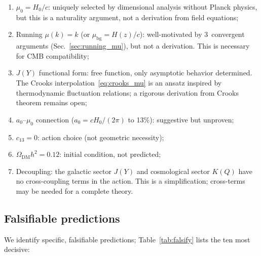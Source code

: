 \documentclass[prd,twocolumn,superscriptaddress,longbibliography,floatfix]{revtex4-2}
\begin{document}
\begin{enumerate}
\item[\textsc{A1.}] $\mu_0 = H_0/c$: uniquely selected by
  dimensional analysis without Planck physics, but this is a
  naturality argument, not a derivation from field equations;
\item[\textsc{A2.}] Running $\mu(k) = k$
  (or $\mu_{\mathrm{bg}} = H(z)/c$): well-motivated by
  3~convergent arguments (Sec.~\ref{sec:running_mu}), but not
  a derivation.  This is necessary for CMB compatibility;
\item[\textsc{A3.}] $J(Y)$ functional form: free function,
  only asymptotic behavior determined.  The Crooks
  interpolation~\eqref{eq:crooks_mu} is an ansatz inspired by
  thermodynamic fluctuation relations; a rigorous derivation
  from Crooks theorem remains open;
\item[\textsc{A4.}] $a_0$--$\mu_0$ connection ($a_0 = cH_0/(2\pi)$
  to 13\%): suggestive but unproven;
\item[\textsc{A5.}] $c_{13} = 0$: action choice (not
  geometric necessity);
\item[\textsc{A6.}] $\Omega_{\mathrm{DM}}h^2 = 0.12$: initial
  condition, not predicted;
\item[\textsc{A7.}] Decoupling: the galactic sector $J(Y)$ and
  cosmological sector $K(Q)$ have no cross-coupling terms in the
  action.  This is a simplification; cross-terms may be needed
  for a complete theory.
\end{enumerate}

\subsection{Falsifiable predictions}

We identify specific, falsifiable predictions;
Table~\ref{tab:falsify} lists the ten most decisive:
\end{document}
